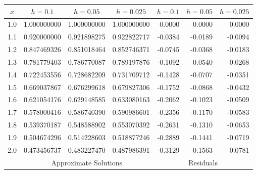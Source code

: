 \documentclass[dvips]{book}
\renewcommand{\exer}[1]{\par\medskip\;\noindent{\color{red}\bf #1.}}
\numberwithin{example}{section}
\numberwithin{equation}{section}
\numberwithin{theorem}{section}
\numberwithin{table}{section}
\numberwithin{figure}{section}
\begin{document}
\exer{3.1.10}
{\small
\begin{tabular}{|c|r|r|r|r|r|r|}\hline
\multicolumn{1}{|c|}{$x$}&
\multicolumn{1}{|c|}{$h=0.1$}&
\multicolumn{1}{|c|}{$h=0.05$}&
\multicolumn{1}{|c|}{$h=0.025$}&
\multicolumn{1}{|c|}{$h=0.1$}&
\multicolumn{1}{|c|}{$h=0.05$}&
\multicolumn{1}{|c|}{$h=0.025$}\\ \hline
1.0 & 1.000000000 & 1.000000000 & 1.000000000 & 0.0000 & 0.0000  &  0.0000  \\
1.1 & 0.920000000 & 0.921898275 & 0.922822717 &-0.0384 & -0.0189 & -0.0094  \\
1.2 & 0.847469326 & 0.851018464 & 0.852746371 &-0.0745 & -0.0368 & -0.0183  \\
1.3 & 0.781779403 & 0.786770087 & 0.789197876 &-0.1092 & -0.0540 & -0.0268  \\
1.4 & 0.722453556 & 0.728682209 & 0.731709712 &-0.1428 & -0.0707 & -0.0351  \\
1.5 & 0.669037867 & 0.676299618 & 0.679827306 &-0.1752 & -0.0868 & -0.0432  \\
1.6 & 0.621054176 & 0.629148585 & 0.633080163 &-0.2062 & -0.1023 & -0.0509  \\
1.7 & 0.578000416 & 0.586740390 & 0.590986601 &-0.2356 & -0.1170 & -0.0583  \\
1.8 & 0.539370187 & 0.548588902 & 0.553070392 &-0.2631 & -0.1310 & -0.0653  \\
1.9 & 0.504674296 & 0.514228603 & 0.518877246 &-0.2889 & -0.1441 & -0.0719  \\
2.0 & 0.473456737 & 0.483227470 & 0.487986391 &-0.3129 & -0.1563 & -0.0781 \\
\hline
&\multicolumn{3}{c|}{Approximate Solutions}&
\multicolumn{3}{c|}{Residuals}\\\hline
\end{tabular}}
\end{document}
